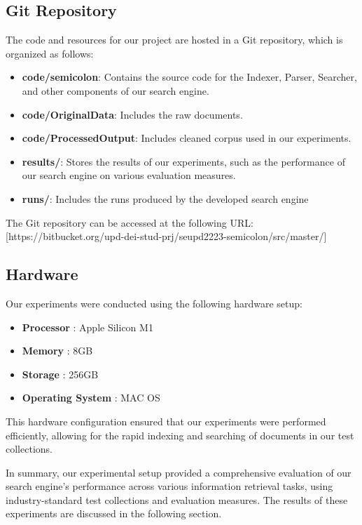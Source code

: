 \subsection{Git Repository}
The code and resources for our project are hosted in a Git repository, which is organized as follows:
\begin{itemize}
\item  \textbf{code/semicolon}: Contains the source code for the Indexer, Parser, Searcher, and other components of our search engine.
\item  \textbf{code/OriginalData}: Includes the raw documents.
\item  \textbf{code/ProcessedOutput}: Includes cleaned corpus used in our experiments.
\item  \textbf{results/}: Stores the results of our experiments, such as the performance of our search engine on various evaluation measures.
\item  \textbf{runs/}: Includes the runs produced by the developed search engine



\end{itemize}
The Git repository can be accessed at the following URL: [https://bitbucket.org/upd-dei-stud-prj/seupd2223-semicolon/src/master/]
\subsection{Hardware}
Our experiments were conducted using the following hardware setup:
\begin{itemize}
\item \textbf{Processor} : Apple Silicon M1
\item \textbf{Memory} : 8GB
\item \textbf{Storage} : 256GB
\item  \textbf{Operating System} : MAC OS
\end{itemize}
\par This hardware configuration ensured that our experiments were performed efficiently, allowing for the rapid indexing and searching of documents in our test collections.

In summary, our experimental setup provided a comprehensive evaluation of our search engine's performance across various information retrieval tasks, using industry-standard test collections and evaluation measures. The results of these experiments are discussed in the following section.

